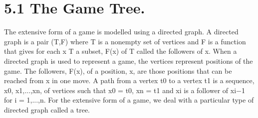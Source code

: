 \section{5.1 The Game Tree.} The extensive form of a game is modelled using a directed
graph. A directed graph is a pair (T,F) where T is a nonempty set of vertices and F is
a function that gives for each x \in T a subset, F(x) of T called the followers of x. When
a directed graph is used to represent a game, the vertices represent positions of the game.
The followers, F(x), of a position, x, are those positions that can be reached from x in one
move.
A path from a vertex t0 to a vertex t1 is a sequence, x0, x1,...,xn, of vertices
such that x0 = t0, xn = t1 and xi is a follower of xi−1 for i = 1,...,n. For the extensive
form of a game, we deal with a particular type of directed graph called a tree.
